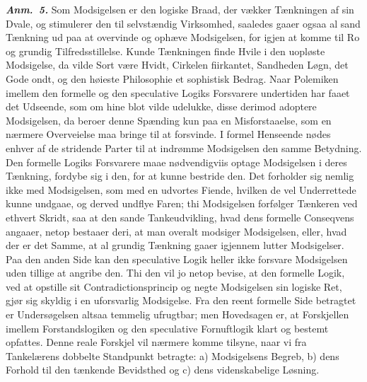 \documentclass[12pt]{book}
\newcommand{\anm}[1]{\emph{\textbf{Anm.~#1.}}}
\newcommand{\opage}[1]{\marginnote{\footnotesize\textit{[#1]}}}
\begin{document}
\anm{5} Som Modsigelsen er den logiske Braad, der vækker Tænkningen af sin
Dvale, og stimulerer den til selvstændig Virksomhed, saaledes gaaer ogsaa al
sand Tænkning ud paa at overvinde og ophæve Modsigelsen, for igjen at komme til
Ro og grundig Tilfredsstillelse. Kunde Tænkningen finde Hvile i den uopløste
Modsigelse, da vilde Sort være Hvidt, Cirkelen fiirkantet, Sandheden Løgn, det
Gode ondt, og den høieste Philosophie et sophistisk Bedrag. Naar Polemiken
imellem den formelle og den speculative Logiks Forsvarere undertiden har faaet
det Udseende, som om hine blot vilde udelukke, disse derimod adoptere
Modsigelsen, da beroer denne Spænding kun paa en Misforstaaelse, som en nærmere
Overveielse maa bringe til at forsvinde. I formel Henseende nødes enhver af de
stridende Parter til at indrømme Modsigelsen den samme Betydning. Den formelle
Logiks Forsvarere maae nødvendigviis optage Modsigelsen i deres Tænkning,
fordybe sig i den, for at kunne bestride den.
\opage{43} Det forholder sig nemlig ikke med Modsigelsen, som med en udvortes Fiende,
hvilken de vel Underrettede kunne undgaae, og derved undflye Faren; thi
Modsigelsen forfølger Tænkeren ved ethvert Skridt, saa at den sande
Tankeudvikling, hvad dens formelle Conseqvens angaaer, netop bestaaer deri, at
man overalt modsiger Modsigelsen, eller, hvad der er det Samme, at al grundig
Tænkning gaaer igjennem lutter Modsigelser. Paa den anden Side kan den
speculative Logik heller ikke forsvare Modsigelsen uden tillige at angribe den.
Thi den vil jo netop bevise, at den formelle Logik, ved at opstille sit
Contradictionsprincip og negte Modsigelsen sin logiske Ret, gjør sig skyldig i
en uforsvarlig Modsigelse. Fra den reent formelle Side betragtet er
Undersøgelsen altsaa temmelig ufrugtbar; men Hovedsagen er, at Forskjellen
imellem Forstandslogiken og den speculative Fornuftlogik klart og bestemt
opfattes. Denne reale Forskjel vil nærmere komme tilsyne, naar vi fra
Tankelærens dobbelte Standpunkt betragte: a) Modsigelsens Begreb, b) dens
Forhold til den tænkende Bevidsthed og c) dens videnskabelige Løsning.
\end{document}
